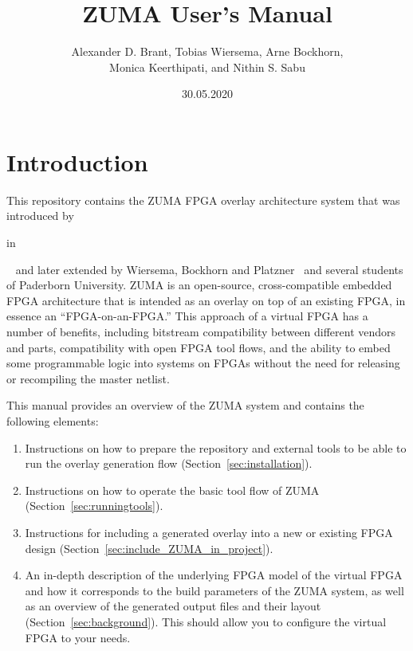\documentclass{article}
\begin{document}
\title{ZUMA User's Manual}
\author{Alexander D. Brant, Tobias Wiersema, Arne Bockhorn,\\ Monica Keerthipati, and Nithin S. Sabu}
\date{30.05.2020}
\maketitle
\tableofcontents

\section{Introduction}
This repository contains the ZUMA FPGA overlay architecture system that was introduced by 
\begin{NoHyper}\citeauthor{brantlemieux2012ZUMA} in \citeyear{brantlemieux2012ZUMA}\end{NoHyper}~\cite{brantlemieux2012ZUMA,brant2013MT} and later extended by Wiersema, Bockhorn and Platzner~\cite{wiersemaBP2014ZUMAReconOS,wiersemaBP2016ZUMAReconOS} and several students of Paderborn University.
ZUMA is an open-source, cross-compatible embedded FPGA architecture that is intended as an overlay on top of an existing FPGA, in essence an ``FPGA-on-an-FPGA.''
This approach of a virtual FPGA has a number of benefits, including bitstream compatibility between different vendors and parts, compatibility with open FPGA tool flows, and the ability to embed some programmable logic into systems on FPGAs without the need for releasing or recompiling the master netlist.

\clearpage
This manual provides an overview of the ZUMA system and contains the following elements:
\begin{enumerate}
    \item Instructions on how to prepare the repository  and external tools to be able to run the overlay generation flow (Section~\ref{sec:installation}).
    \item Instructions on how to operate the basic tool flow of ZUMA (Section~\ref{sec:runningtools}).
    \item Instructions for including a generated overlay into a new or existing FPGA design (Section~\ref{sec:include_ZUMA_in_project}).
    \item An in-depth description of the underlying FPGA model of the virtual FPGA and how it corresponds to the build parameters of the ZUMA system, as well as an overview of the generated output files and their layout (Section~\ref{sec:background}).
    This should allow you to configure the virtual FPGA to your needs.
\end{enumerate}
\end{document}
